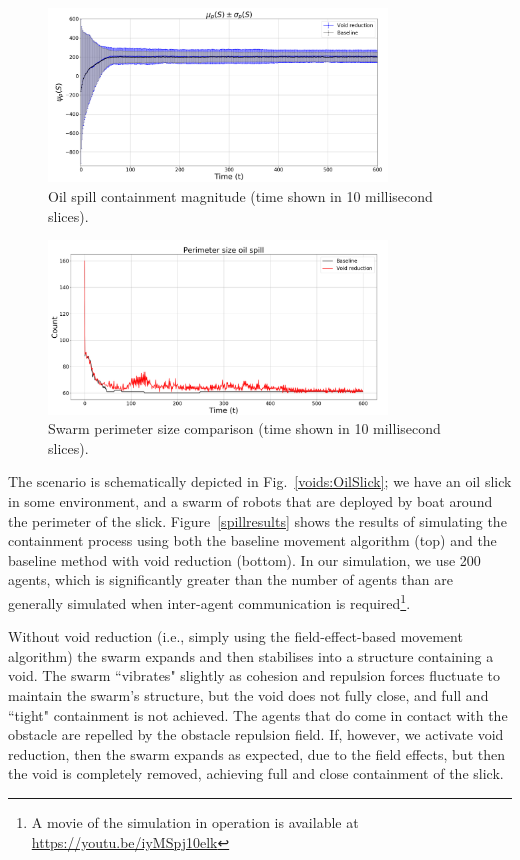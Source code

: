 \documentclass[letterpaper]{article}
\begin{document}
 \begin{figure}
 \begin{center}
 \includegraphics[width=9cm]{figures/OilSpillMagnitude}
 \end{center}
 \caption{Oil spill containment magnitude (time shown in 10 millisecond slices). \label{concave:OilSpillPerimeter8060-MAG-1}}
 \end{figure}

\begin{figure}
 \begin{center}
 \includegraphics[width=9cm]{figures/Perimetersize}
 \end{center}
 \caption{Swarm perimeter size comparison (time shown in 10 millisecond slices). \label{concave:OilSpillPerimeter8060-1}}
 \end{figure}

The scenario is schematically depicted in Fig.~\ref{voids:OilSlick}; we have an oil slick in some environment, and a swarm of robots that are deployed by boat around the perimeter of the slick.
Figure~\ref{spillresults} shows the results of simulating the containment process using both the baseline movement algorithm (top) and the baseline method with void reduction (bottom). In our simulation, we use 200 agents, which is significantly greater than the number of agents than are generally simulated when inter-agent communication is required{\footnote{A movie of the simulation in operation is available at \url{https://youtu.be/iyMSpj10elk}}}.

Without void reduction (i.e., simply using the field-effect-based movement algorithm) the swarm expands and then stabilises into a structure containing a void.  The swarm ``vibrates" slightly as cohesion and repulsion forces fluctuate to maintain the swarm's structure, but the void does not fully close, and full and ``tight" containment is not achieved. The agents that do come in contact with the obstacle are repelled by the obstacle repulsion field. If, however, we activate void reduction, then the swarm expands as expected, due to the field effects, but then the void is completely removed, achieving full and close containment of the slick.
\end{document}
